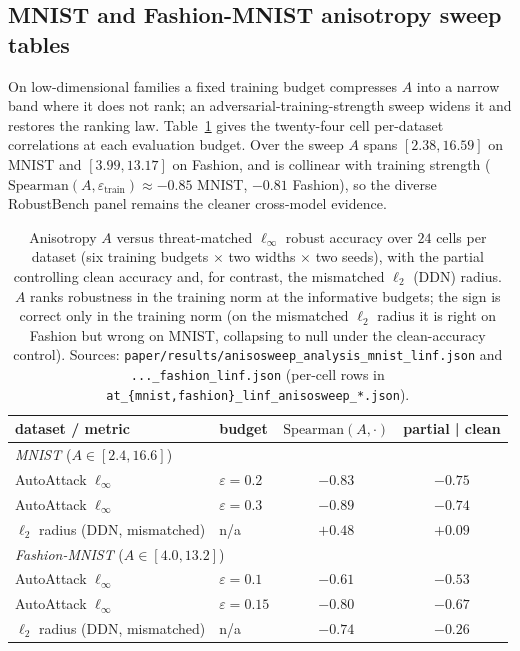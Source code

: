 \subsection{MNIST and Fashion-MNIST anisotropy sweep tables}\label{app:anisosweep-full}
On low-dimensional families a fixed training budget compresses $A$ into a narrow
band where it does not rank; an adversarial-training-strength sweep widens it and
restores the ranking law. Table~\ref{tab:anisosweep-corr} gives the twenty-four
cell per-dataset correlations at each evaluation budget. Over the sweep $A$ spans
$[2.38,16.59]$ on MNIST and $[3.99,13.17]$ on Fashion, and is collinear with
training strength ($\mathrm{Spearman}(A,\varepsilon_{\mathrm{train}})\approx-0.85$
MNIST, $-0.81$ Fashion), so the diverse RobustBench panel remains the cleaner
cross-model evidence.

\begin{table}[t]\centering
\caption{Anisotropy $A$ versus threat-matched $\ell_\infty$ robust accuracy over
$24$ cells per dataset (six training budgets $\times$ two widths $\times$ two
seeds), with the partial controlling clean accuracy and, for contrast, the
mismatched $\ell_2$ (DDN) radius. $A$ ranks robustness in the training norm at the
informative budgets; the sign is correct only in the training norm (on the
mismatched $\ell_2$ radius it is right on Fashion but wrong on MNIST, collapsing
to null under the clean-accuracy control). Sources:
\texttt{paper/results/anisosweep\_analysis\_mnist\_linf.json} and
\texttt{...\_fashion\_linf.json} (per-cell rows in
\texttt{at\_\{mnist,fashion\}\_linf\_anisosweep\_*.json}).}
\label{tab:anisosweep-corr}
\small
\begin{tabular}{llcc}
\toprule
dataset / metric & budget & $\mathrm{Spearman}(A,\cdot)$ & partial | clean \\
\midrule
\multicolumn{4}{l}{\emph{MNIST} ($A\in[2.4,16.6]$)}\\
AutoAttack $\ell_\infty$ & $\varepsilon{=}0.2$ & $-0.83$ & $-0.75$ \\
AutoAttack $\ell_\infty$ & $\varepsilon{=}0.3$ & $-0.89$ & $-0.74$ \\
$\ell_2$ radius (DDN, mismatched) & n/a & $+0.48$ & $+0.09$ \\
\midrule
\multicolumn{4}{l}{\emph{Fashion-MNIST} ($A\in[4.0,13.2]$)}\\
AutoAttack $\ell_\infty$ & $\varepsilon{=}0.1$  & $-0.61$ & $-0.53$ \\
AutoAttack $\ell_\infty$ & $\varepsilon{=}0.15$ & $-0.80$ & $-0.67$ \\
$\ell_2$ radius (DDN, mismatched) & n/a & $-0.74$ & $-0.26$ \\
\bottomrule
\end{tabular}
\end{table}

